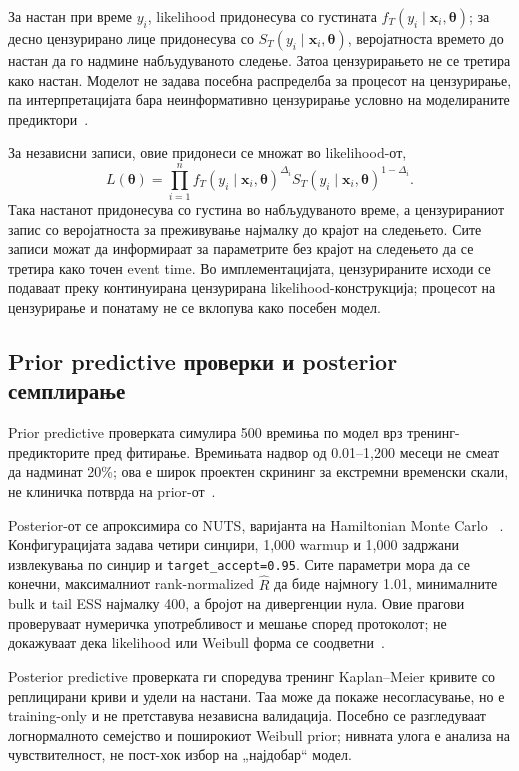 \documentclass[12pt]{article}
\begin{document}
За настан при време $y_i$, likelihood придонесува со густината
$f_T(y_i\mid\mathbf{x}_i,\boldsymbol{\theta})$; за десно цензурирано лице
придонесува со $S_T(y_i\mid\mathbf{x}_i,\boldsymbol{\theta})$, веројатноста
времето до настан да го надмине набљудуваното следење. Затоа цензурирањето не
се третира како настан. Моделот не задава посебна распределба за процесот на
цензурирање, па интерпретацијата бара неинформативно цензурирање условно на
моделираните предиктори~\cite{kalbfleisch2002}.

За независни записи, овие придонеси се множат во likelihood-от,
\[
L(\boldsymbol{\theta})=\prod_{i=1}^{n}
f_T(y_i\mid\mathbf{x}_i,\boldsymbol{\theta})^{\Delta_i}
S_T(y_i\mid\mathbf{x}_i,\boldsymbol{\theta})^{1-\Delta_i}.
\]
Така настанот придонесува со густина во набљудуваното време, а цензурираниот
запис со веројатноста за преживување најмалку до крајот на следењето. Сите
записи можат да информираат за параметрите без крајот на следењето да се третира
како точен event time. Во имплементацијата, цензурираните исходи се подаваат
преку континуирана цензурирана likelihood-конструкција; процесот на цензурирање
и понатаму не се вклопува како посебен модел.

\subsection{Prior predictive проверки и posterior семплирање}

Prior predictive проверката симулира 500 времиња по модел врз тренинг-
предикторите пред фитирање. Времињата надвор од 0.01--1,200 месеци не смеат да
надминат 20\%; ова е широк проектен скрининг за екстремни временски скали, не
клиничка потврда на prior-от~\cite{gelman2013}.

Posterior-от се апроксимира со NUTS, варијанта на Hamiltonian Monte Carlo
~\cite{hoffman2014}. Конфигурацијата задава четири синџири, 1,000 warmup и
1,000 задржани извлекувања по синџир и \texttt{target\_accept=0.95}. Сите параметри
мора да се конечни, максималниот rank-normalized $\widehat R$ да биде најмногу
1.01, минималните bulk и tail ESS најмалку 400, а бројот на дивергенции нула.
Овие прагови проверуваат нумеричка употребливост и мешање според протоколот;
не докажуваат дека likelihood или Weibull форма се соодветни~\cite{vehtari2021}.

Posterior predictive проверката ги споредува тренинг Kaplan--Meier кривите со
реплицирани криви и удели на настани. Таа може да покаже несогласување, но е
training-only и не претставува независна валидација. Посебно се разгледуваат
логнормалното семејство и поширокиот Weibull prior; нивната улога е анализа на
чувствителност, не пост-хок избор на „најдобар“ модел.
\end{document}
